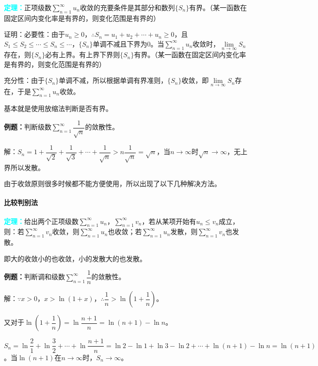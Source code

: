 \documentclass[UTF8, 12pt]{ctexart}
\begin{document}
        \textcolor{aqua}{\textbf{定理：}}正项级数$\sum\limits_{n=1}^\infty u_n$收敛的充要条件是其部分和数列$\{S_n\}$有界。（某一函数在固定区间内变化率是有界的，则变化范围是有界的）

        证明：必要性：由于$u_n\geqslant0$，$\therefore S_n=u_1+u_2+\cdots+u_n\geqslant0$，且$S_1\leqslant S_2\leqslant\cdots\leqslant S_n\leqslant\cdots$，$\{S_n\}$单调不减且下界为0。当$\sum\limits_{n=1}^\infty u_n$收敛时，$\lim\limits_{n\to\infty}S_n$存在，则$\{S_n\}$必有上界。有上界下界则$\{S_n\}$有界。（某一函数在固定区间内变化率是有界的，则变化范围是有界的）

        充分性：由于$\{S_n\}$单调不减，所以根据单调有界准则，$\{S_n\}$收敛，即$\lim\limits_{n\to\infty}S_n$存在，于是$\sum\limits_{n=1}^\infty u_n$收敛。

        基本就是使用放缩法判断是否有界。

        \textbf{例题：}判断级数$\sum\limits_{n=1}^\infty\dfrac{1}{\sqrt{n}}$的敛散性。

        解：$S_n=1+\dfrac{1}{\sqrt{2}}+\dfrac{1}{\sqrt{3}}+\cdots+\dfrac{1}{\sqrt{n}}>n\dfrac{1}{\sqrt{n}}=\sqrt{n}$，当$n\to\infty$时$\sqrt{n}\to\infty$，无上界所以发散。

        由于收敛原则很多时候都不能方便使用，所以出现了以下几种解决方法。

        \paragraph{比较判别法} \leavevmode \medskip

        \textcolor{aqua}{\textbf{定理：}}给出两个正项级数$\sum\limits_{n=1}^\infty u_n$，$\sum\limits_{n=1}^\infty v_n$，若从某项开始有$u_n\leqslant v_n$成立，则：若$\sum\limits_{n=1}^\infty v_n$收敛，则$\sum\limits_{n=1}^\infty u_n$也收敛；若$\sum\limits_{n=1}^\infty u_n$发散，则$\sum\limits_{n=1}^\infty v_n$也发散。

        即大的收敛小的也收敛，小的发散大的也发散。

        \textbf{例题：}判断调和级数$\sum\limits_{n=1}^\infty\dfrac{1}{n}$的敛散性。

        解：$\because x>0$，$x>\ln(1+x)$，$\therefore\dfrac{1}{n}>\ln\left(1+\dfrac{1}{n}\right)$。

        又对于$\ln\left(1+\dfrac{1}{n}\right)=\ln\dfrac{n+1}{n}=\ln(n+1)-\ln n$。

        $S_n=\ln\dfrac{2}{1}+\ln\dfrac{3}{2}+\cdots+\ln\dfrac{n+1}{n}=\ln2-\ln1+\ln3-\ln2+\cdots+\ln(n+1)-\ln n=\ln(n+1)$。当$\ln(n+1)$在$n\to\infty$时，$S_n\to\infty$。
\end{document}
